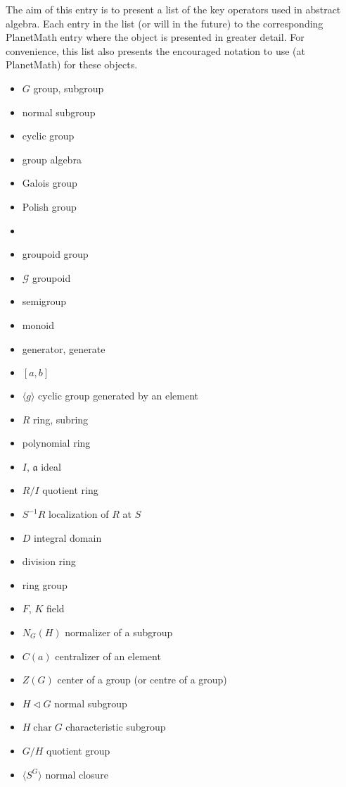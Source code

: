\documentclass[12pt]{article}
\begin{document}
The aim of this entry is to present a list of the key  operators used in abstract algebra. Each entry in the list  (or will  in the future) to the corresponding PlanetMath entry where the object is presented in greater detail. For convenience, this list also presents the encouraged notation to use (at PlanetMath) for these objects.

\begin{itemize}
\item $G$ group, subgroup
\item normal subgroup
\item cyclic group
\item group algebra
\item Galois group
\item Polish group
\item {}
\item groupoid group
\item $\mathcal{G}$ groupoid
\item semigroup
\item monoid
\item generator, generate
\item $[a,b]$ 
\item $\langle g \rangle$ cyclic group generated by an element
\item $R$ ring, subring
\item polynomial ring
\item $I$, $\mathfrak{a}$ ideal
\item $R/I$ quotient ring
\item $S^{-1}R$ localization of $R$ at $S$
\item $D$ integral domain
\item division ring
\item ring group
\item $F$, $K$ field
\item $N_G(H)$ normalizer of a subgroup
\item $C(a)$ centralizer of an element
\item $Z(G)$ center of a group (or centre of a group)
\item $H \triangleleft G$ normal subgroup
\item $H \operatorname{char} G$ characteristic subgroup
\item $G/H$ quotient group
\item $\langle S^G\rangle$ normal closure

\end{itemize}
\end{document}
